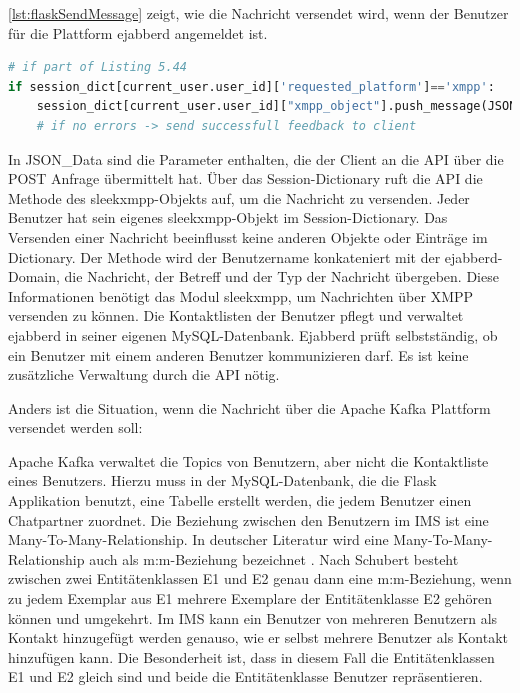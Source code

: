 \documentclass[a4paper,titlepage,halfparskip,12pt]{scrreprt}
\begin{document}
\begin{onehalfspacing}
\autoref{lst:flaskSendMessage} zeigt, wie die Nachricht versendet wird, wenn der Benutzer für die Plattform ejabberd angemeldet ist.

\begin{lstlisting}[language=python, caption={Code für den Versand einer Nachricht über die \acs{API} an ejabberd}, label={lst:flaskSendMessage}]
# if part of Listing 5.44
if session_dict[current_user.user_id]['requested_platform']=='xmpp':
    session_dict[current_user.user_id]["xmpp_object"].push_message(JSON_Data["to"]+"@ejabberd-server", JSON_Data["msg_body"], JSON_Data["msg_subject"], JSON_Data["msg_type"])
    # if no errors -> send successfull feedback to client
\end{lstlisting}


In {JSON\_Data} sind die Parameter enthalten, die der Client an die \acs{API} über die POST Anfrage übermittelt hat.
Über das Session-Dictionary ruft die \acs{API} die Methode des sleekxmpp-Objekts auf, um die Nachricht zu versenden. Jeder Benutzer hat sein eigenes sleekxmpp-Objekt im Session-Dictionary. Das Versenden einer Nachricht beeinflusst keine anderen Objekte oder Einträge im Dictionary. Der Methode wird der Benutzername konkateniert mit der ejabberd-Domain, die Nachricht, der Betreff und der Typ der Nachricht übergeben. Diese Informationen benötigt das Modul sleekxmpp, um Nachrichten über \acs{XMPP} versenden zu können. Die Kontaktlisten der Benutzer pflegt und verwaltet ejabberd in seiner eigenen MySQL-Datenbank. Ejabberd prüft selbstständig, ob ein Benutzer mit einem anderen Benutzer kommunizieren darf. Es ist keine zusätzliche Verwaltung durch die \acs{API} nötig.

Anders ist die Situation, wenn die Nachricht über die Apache Kafka Plattform versendet werden soll:

Apache Kafka verwaltet die Topics von Benutzern, aber nicht die Kontaktliste eines Benutzers. Hierzu muss in der MySQL-Datenbank, die die Flask Applikation benutzt, eine Tabelle erstellt werden, die jedem Benutzer einen Chatpartner zuordnet. Die Beziehung zwischen den Benutzern im \acs{IMS} ist eine Many-To-Many-Relationship. In deutscher Literatur wird eine Many-To-Many-Relationship auch als m:m-Beziehung bezeichnet \cite{Schubert2007}. Nach Schubert \cite{Schubert2007} besteht zwischen zwei Entitätenklassen E1 und E2 genau dann eine m:m-Beziehung, wenn zu jedem Exemplar aus E1 mehrere Exemplare der Entitätenklasse E2 gehören können und umgekehrt. Im \acs{IMS} kann ein Benutzer von mehreren Benutzern als Kontakt hinzugefügt werden genauso, wie er selbst mehrere Benutzer als Kontakt hinzufügen kann. Die Besonderheit ist, dass in diesem Fall die Entitätenklassen E1 und E2 gleich sind und beide die Entitätenklasse Benutzer repräsentieren.


\end{onehalfspacing}
\end{document}
